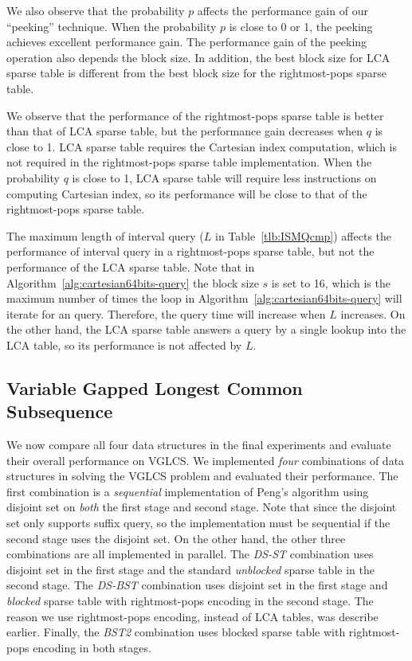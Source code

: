 

We also observe that the probability $p$ affects the performance gain
of our ``peeking'' technique.  When the probability $p$ is close to 0
or 1, the peeking achieves excellent performance gain.  The
performance gain of the peeking operation also depends the block size.
In addition, the best block size for LCA sparse table is different
from the best block size for the rightmost-pops sparse table.

We observe that the performance of the rightmost-pops sparse table is
better than that of LCA sparse table, but the performance gain decreases
when $q$ is close to 1.  LCA sparse table requires the Cartesian index
computation, which is not required in the rightmost-pops sparse table
implementation.  When the probability $q$ is close to 1, LCA sparse
table will require less instructions on computing Cartesian index, so
its performance will be close to that of the rightmost-pops sparse
table.

The maximum length of interval query ($L$ in Table~\ref{tlb:ISMQcmp})
affects the performance of interval query in a rightmost-pops sparse
table, but not the performance of the LCA sparse table.  Note that in
Algorithm~\ref{alg:cartesian64bits-query} the block size $s$ is set to
16, which is the maximum number of times the loop in
Algorithm~\ref{alg:cartesian64bits-query} will iterate for an query.
Therefore, the query time will increase when $L$ increases.  On the
other hand, the LCA sparse table answers a query by a single lookup
into the LCA table, so its performance is not affected by $L$.

\subsection{Variable Gapped Longest Common Subsequence}

We now compare all four data structures in the final experiments and
evaluate their overall performance on VGLCS.  We implemented {\em
  four} combinations of data structures in solving the VGLCS problem
and evaluated their performance.  The first combination is a {\em
  sequential} implementation of Peng's algorithm using disjoint set on
{\em both} the first stage and second stage.  Note that since the
disjoint set only supports suffix query, so the implementation must be
sequential if the second stage uses the disjoint set.  On the other
hand, the other three combinations are all implemented in
parallel. The {\em DS-ST} combination uses disjoint set in the first
stage and the standard {\em unblocked} sparse table in the second
stage.  The {\em DS-BST} combination uses disjoint set in the first
stage and {\em blocked} sparse table with rightmost-pops encoding in
the second stage.  The reason we use rightmost-pops encoding, instead
of LCA tables, was describe earlier.  Finally, the {\em BST2}
combination uses blocked sparse table with rightmost-pops encoding in
both stages.

